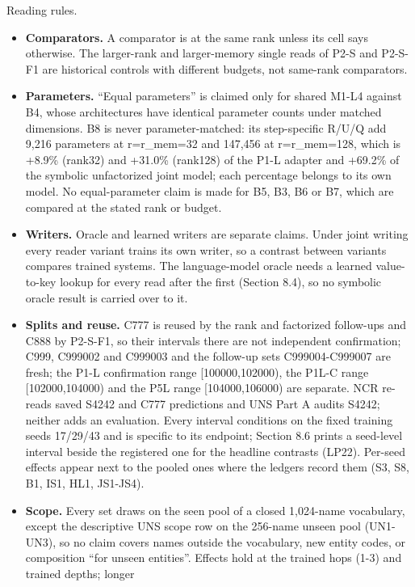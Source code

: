 \begin{landscape}
Reading rules.

\begin{itemize}[leftmargin=1.4em,itemsep=2pt,topsep=3pt]
\item \textbf{Comparators.} A comparator is at the same rank unless its cell says otherwise. The larger-rank
and larger-memory single reads of P2-S and P2-S-F1 are historical controls with different
budgets, not same-rank comparators.
\item \textbf{Parameters.} “Equal parameters” is claimed only for shared M1-L4 against B4, whose
architectures have identical parameter counts under matched dimensions. B8 is never
parameter-matched: its step-specific R/\allowbreak{}U/\allowbreak{}Q add 9,216 parameters at r=r\_mem=32 and 147,456 at
r=r\_mem=128, which is +8.9\% (rank32) and +31.0\% (rank128) of the P1-L adapter and +69.2\% of the
symbolic unfactorized joint model; each percentage belongs to its own model. No equal-parameter claim is
made for B5, B3, B6 or B7, which are compared at the stated rank or budget.  %
\item \textbf{Writers.} Oracle and learned writers are separate claims. Under joint writing every reader
variant trains its own writer, so a contrast between variants compares trained systems. The
language-model oracle needs a learned value-to-key lookup for every read after the first
(Section 8.4), so no symbolic oracle result is carried over to it.
\item \textbf{Splits and reuse.} C777 is reused by the rank and factorized follow-ups and C888 by P2-S-F1, so
their intervals there are not independent confirmation; C999, C999002 and C999003 and the follow-up
sets C999004-C999007 are fresh; the P1-L confirmation range [100000,102000), the P1L-C range [102000,104000) and the P5L range [104000,106000) are separate. NCR re-reads saved S4242 and C777 predictions and UNS Part A audits S4242;
neither adds an evaluation. Every
interval conditions on the fixed training seeds 17/\allowbreak{}29/\allowbreak{}43 and is specific to its endpoint; Section 8.6 prints a seed-level interval beside the registered one for the headline contrasts (LP22). Per-seed
effects appear next to the pooled ones where the ledgers record them (S3, S8, B1, IS1, HL1, JS1-JS4).
\item \textbf{Scope.} Every set draws on the seen pool of a closed 1,024-name vocabulary, except the descriptive
UNS scope row on the 256-name unseen pool (UN1-UN3), so no claim covers names outside the vocabulary,
new entity codes, or composition “for unseen entities”. Effects hold at the trained hops (1-3) and trained depths; longer

\end{itemize}
\end{landscape}
